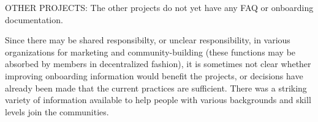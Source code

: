 OTHER PROJECTS: The other projects do not yet have any FAQ or onboarding documentation.

Since there may be shared responsibilty, or unclear responsibility, in various organizations for marketing and community-building (these functions may be absorbed by members in decentralized fashion), it is sometimes not clear whether improving onboarding information would benefit the projects, or decisions have already been made that the current practices are sufficient. There was a striking variety of information available to help people with various backgrounds and skill levels join the communities. 




